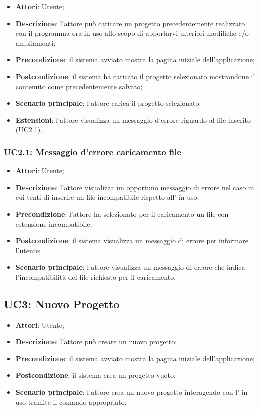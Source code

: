 	\begin{itemize}
		\item \textbf{Attori}: Utente;
		\item \textbf{Descrizione}: l'attore può caricare un progetto precedentemente realizzato con il programma ora in uso allo scopo di apportarvi ulteriori modifiche e/o ampliamenti;
		\item \textbf{Precondizione}: il sistema avviato mostra la pagina iniziale dell'applicazione;
		\item \textbf{Postcondizione}: il sistema ha caricato il progetto selezionato mostrandone il contenuto come precedentemente salvato;
		\item \textbf{Scenario principale}: l'attore carica il progetto selezionato.
		\item \textbf{Estensioni}: l'attore visualizza un messaggio d'errore riguardo al file inserito (UC2.1).
	\end{itemize}

	\subsubsection{UC2.1: Messaggio d'errore caricamento file}
	\label{UC2.1}
		\begin{itemize}
			\item \textbf{Attori}: Utente;
			\item \textbf{Descrizione}: l'attore visualizza un opportuno messaggio di errore nel caso in cui tenti di inserire un file incompatibile rispetto all' in uso;
			\item \textbf{Precondizione}: l'attore ha selezionato per il caricamento un file con estensione incompatibile;
			\item \textbf{Postcondizione}: il sistema visualizza un messaggio di errore per informare l'utente;
			\item \textbf{Scenario principale}: l'attore visualizza un messaggio di errore che indica l'incompatibilità del file richiesto per il caricamento.
		\end{itemize}

\subsection{UC3: Nuovo Progetto}
\label{UC3}
\begin{itemize}
\item \textbf{Attori}: Utente;
\item \textbf{Descrizione}: l'attore può creare un nuovo progetto; 
\item \textbf{Precondizione}: il sistema avviato mostra la pagina iniziale dell'applicazione;
\item \textbf{Postcondizione}: il sistema crea un progetto vuoto;
\item \textbf{Scenario principale}:
l'attore crea un nuovo progetto interagendo con l' in uso tramite il comando appropriato.
\end{itemize}

